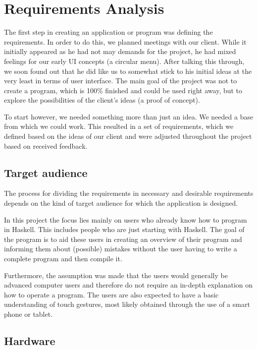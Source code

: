 \chapter{Requirements Analysis}

The first step in creating an application or program was defining the requirements. In order to do this, we planned meetings with our client.
While it initially appeared as he had not may demands for the project, he had mixed feelings for our early UI concepts (a circular menu). After talking this through, we soon found out that he did like us to somewhat stick to his initial ideas at the very least in terms of user interface. The main goal of the project was not to create a program, which is 100\% finished and could be used right away, but to explore the possibilities of the client's ideas (a proof of concept).

To start however, we needed something more than just an idea. We needed a base from which we could work. This resulted in a set of requirements, which we defined based on the ideas of our client and were adjusted throughout the project based on received feedback.

\section{Target audience}

The process for dividing the requirements in necessary and desirable requirements depends on the kind of target audience for which the application is designed.  

In this project the focus lies mainly on users who already know how to program in Haskell. This includes people who are just starting with Haskell.
The goal of the program is to aid these users in creating an overview of their program and informing them about (possible) mistakes without the user having to write a complete program and then compile it.

Furthermore, the assumption was made that the users would generally be advanced computer users and therefore do not require an in-depth explanation on how to operate a program. The users are also expected to have a basic understanding of touch gestures, most likely obtained through the use of a smart phone or tablet.

\section{Hardware}

